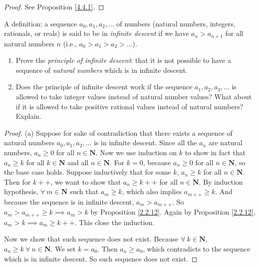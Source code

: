\begin{proof}
    See Proposition \ref{4.4.1}.
\end{proof}

\begin{exercise}\label{ex 4.4.2}
    A definition: a sequence \(a_0, a_1, a_2, \dots\) of numbers (natural numbers, integers, rationals, or reals) is said to be in \emph{infinite descent} if we have \(a_n > a_{n + 1}\) for all natural numbers \(n\)
    (i.e., \(a_0 > a_1 > a_2 > \dots\)).
    \begin{enumerate}
        \item Prove the \emph{principle of infinite descent}:
              that it is not possible to have a sequence of \emph{natural numbers} which is in infinite descent.
        \item Does the principle of infinite descent work if the sequence \(a_1, a_2, a_3, \dots\) is allowed to take integer values instead of natural number values?
              What about if it is allowed to take positive rational values instead of natural numbers?
              Explain.
    \end{enumerate}
\end{exercise}

\begin{proof}{(a)}
    Suppose for sake of contradiction that there exists a sequence of natural numbers \(a_0, a_1, a_2, \dots\) is in infinite descent.
    Since all the \(a_n\) are natural numbers, \(a_n \geq 0\) for all \(n \in \mathbf{N}\).
    Now we use induction on \(k\) to show in fact that \(a_n \geq k\) for all \(k \in \mathbf{N}\) and all \(n \in \mathbf{N}\).
    For \(k = 0\), because \(a_n \geq 0\) for all \(n \in \mathbf{N}\), so the base case holds.
    Suppose inductively that for some \(k\), \(a_n \geq k\) for all \(n \in \mathbf{N}\).
    Then for \(k++\), we want to show that \(a_n \geq k++\) for all \(n \in \mathbf{N}\).
    By induction hypothesis, \(\forall\ m \in \mathbf{N}\) such that \(a_m \geq k\), which also implies \(a_{m++} \geq k\).
    And because the sequence is in infinite descent, \(a_m > a_{m++}\).
    So \(a_m > a_{m++} \geq k \implies a_m > k\) by Proposition \ref{2.2.12}.
    Again by Proposition \ref{2.2.12}, \(a_m > k \implies a_m \geq k++\).
    This close the induction.

    Now we show that such sequence does not exist.
    Because \(\forall\ k \in \mathbf{N}\), \(a_n \geq k \ \forall\ n \in \mathbf{N}\).
    We set \(k = a_0\).
    Then \(a_n \geq a_0\), which contradicts to the sequence which is in infinite descent.
    So such sequence does not exist.
\end{proof}


